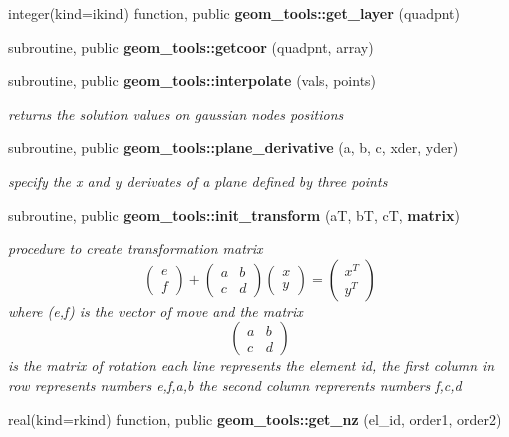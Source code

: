 \begin{DoxyCompactItemize}
\item 
integer(kind=ikind) function, public {\bf geom\+\_\+tools\+::get\+\_\+layer} (quadpnt)
\item 
subroutine, public {\bf geom\+\_\+tools\+::getcoor} (quadpnt, array)
\item 
subroutine, public {\bf geom\+\_\+tools\+::interpolate} (vals, points)
\begin{DoxyCompactList}\small\item\em returns the solution values on gaussian nodes positions \end{DoxyCompactList}\item 
subroutine, public {\bf geom\+\_\+tools\+::plane\+\_\+derivative} (a, b, c, xder, yder)
\begin{DoxyCompactList}\small\item\em specify the x and y derivates of a plane defined by three points \end{DoxyCompactList}\item 
subroutine, public {\bf geom\+\_\+tools\+::init\+\_\+transform} (aT, bT, cT, {\bf matrix})
\begin{DoxyCompactList}\small\item\em procedure to create transformation matrix \[ \left( \begin{array}{c} e \\ f \end{array} \right) + \left( \begin{array}{cc} a & b \\ c & d \end{array}\right) \left( \begin{array}{c} x \\ y \end{array} \right) = \left( \begin{array}{c} x^T \\ y^T \end{array} \right) \] where (e,f) is the vector of move and the matrix \[ \left( \begin{array}{cc} a & b \\ c & d \end{array}\right) \] is the matrix of rotation each line represents the element id, the first column in row represents numbers e,f,a,b the second column reprerents numbers f,c,d \end{DoxyCompactList}\item 
real(kind=rkind) function, public {\bf geom\+\_\+tools\+::get\+\_\+nz} (el\+\_\+id, order1, order2)

\end{DoxyCompactItemize}
